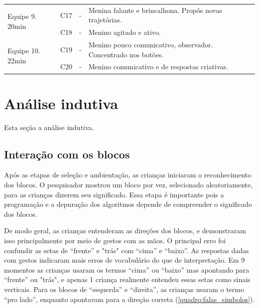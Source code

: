 \begin{quadro}[!h]
{\begin{footnotesize}
{\begin{tabular}{|l|l|l|p{11cm}|}
            \hline
            \multirow{2}{*}{Equipe 9. 20min}                & C17              & -                            & Menina falante e brincalhona. Propôs novas trajetórias.                                                            \\ 
            \cline{2-4}
                                                            & C18              & -                            & Menino agitado e ativo.                                                                                            \\ 
            \hline
            \multirow{2}{*}{Equipe 10. 22min}               & C19              & -                            & Menino pouco comunicativo, observador. Concentrado nos botões.                                                     \\ 
            \cline{2-4}
                                                            & C20              & -                            & Menino comunicativo e de respostas criativas.                                                                                    \\
            \hline
            \end{tabular}
        }
        \end{footnotesize}
    }
\end{quadro}

\section{Análise indutiva}

Esta seção a análise indutiva. 

\subsection{Interação com os blocos}

Após as etapas de seleção e ambientação, as crianças iniciaram o reconhecimento dos blocos. O pesquisador mostrou um bloco por vez, selecionado aleatoriamente, para as crianças dizerem seu significado. Essa etapa é importante pois a programação e a depuração dos algoritmos depende de compreender o significado dos blocos. 

De modo geral, as crianças entenderam as direções dos blocos, e demonstraram isso principalmente por meio de gestos com as mãos. O principal erro foi confundir as setas de “frente” e "trás" com “cima” e “baixo”. As respostas dadas com gestos indicaram mais erros de vocabulário do que de interpretação. Em 9 momentos as crianças usaram os termos “cima” ou “baixo” mas apontando para “frente” ou "trás", e apenas 1 criança realmente entendeu essas setas como sinais verticais. Para os blocos de “esquerda” e “direita”, as crianças usaram o termo “pro lado”, enquanto apontavam para a direção correta (\autoref{quadro:falas_simbolos}).

